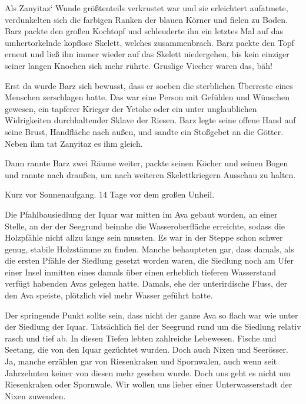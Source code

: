 Als Zanyitaz‘ Wunde größtenteils verkrustet war und sie erleichtert aufatmete, verdunkelten sich die farbigen Ranken der blauen Körner und fielen zu Boden. Barz packte den großen Kochtopf und schleuderte ihn ein letztes Mal auf das umhertorkelnde kopflose Skelett, welches zusammenbrach. Barz packte den Topf erneut und ließ ihn immer wieder auf das Skelett niedergehen, bis kein einziger seiner langen Knochen sich mehr rührte. Gruslige Viecher waren das, bäh!

Erst da wurde Barz sich bewusst, dass er soeben die sterblichen Überreste eines Menschen zerschlagen hatte. Das war eine Person mit Gefühlen und Wünschen gewesen, ein tapferer Krieger der Yetohe oder ein unter unglaublichen Widrigkeiten durchhaltender Sklave der Riesen. Barz legte seine offene Hand auf seine Brust, Handfläche nach außen, und sandte ein Stoßgebet an die Götter. Neben ihm tat Zanyitaz es ihm gleich.

Dann rannte Barz zwei Räume weiter, packte seinen Köcher und seinen Bogen und rannte nach draußen, um nach weiteren Skelettkriegern Ausschau zu halten.\bigskip







Kurz vor Sonnenaufgang. 14 Tage vor dem großen Unheil.\bigskip



Die Pfahlbausiedlung der Iquar war mitten im Ava gebaut worden, an einer Stelle, an der der Seegrund beinahe die Wasseroberfläche erreichte, sodass die Holzpfähle nicht allzu lange sein mussten. Es war in der Steppe schon schwer genug, stabile Holzstämme zu finden. Manche behaupteten gar, dass damals, als die ersten Pfähle der Siedlung gesetzt worden waren, die Siedlung noch am Ufer einer Insel inmitten eines damals über einen erheblich tieferen Wasserstand verfügt habenden Avas gelegen hatte. Damals, ehe der unterirdische Fluss, der den Ava speiste, plötzlich viel mehr Wasser geführt hatte.

Der springende Punkt sollte sein, dass nicht der ganze Ava so flach war wie unter der Siedlung der Iquar. Tatsächlich fiel der Seegrund rund um die Siedlung relativ rasch und tief ab. In diesen Tiefen lebten zahlreiche Lebewesen. Fische und Seetang, die von den Iquar gezüchtet wurden. Doch auch Nixen und Seerösser. Ja, manche erzählen gar von Riesenkraken und Spornwalen, auch wenn seit Jahrzehnten keiner von diesen mehr gesehen wurde. Doch uns geht es nicht um Riesenkraken oder Spornwale. Wir wollen uns lieber einer Unterwasserstadt der Nixen zuwenden.

